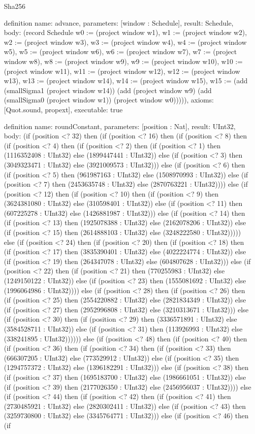 \begin{lexlean}{Sha256}
\begin{semanticmodule}
definition{
  name: advance,
  parameters: [window : Schedule],
  result: Schedule,
  body: (record Schedule {w0 := (project window w1), w1 := (project window w2), w2 := (project window w3), w3 := (project window w4), w4 := (project window w5), w5 := (project window w6), w6 := (project window w7), w7 := (project window w8), w8 := (project window w9), w9 := (project window w10), w10 := (project window w11), w11 := (project window w12), w12 := (project window w13), w13 := (project window w14), w14 := (project window w15), w15 := (add (smallSigma1 (project window w14)) (add (project window w9) (add (smallSigma0 (project window w1)) (project window w0))))}),
  axioms: [Quot.sound, propext],
  executable: true
}

definition{
  name: roundConstant,
  parameters: [position : Nat],
  result: UInt32,
  body: (if (position <? 32) then (if (position <? 16) then (if (position <? 8) then (if (position <? 4) then (if (position <? 2) then (if (position <? 1) then (1116352408 : UInt32) else (1899447441 : UInt32)) else (if (position <? 3) then (3049323471 : UInt32) else (3921009573 : UInt32))) else (if (position <? 6) then (if (position <? 5) then (961987163 : UInt32) else (1508970993 : UInt32)) else (if (position <? 7) then (2453635748 : UInt32) else (2870763221 : UInt32)))) else (if (position <? 12) then (if (position <? 10) then (if (position <? 9) then (3624381080 : UInt32) else (310598401 : UInt32)) else (if (position <? 11) then (607225278 : UInt32) else (1426881987 : UInt32))) else (if (position <? 14) then (if (position <? 13) then (1925078388 : UInt32) else (2162078206 : UInt32)) else (if (position <? 15) then (2614888103 : UInt32) else (3248222580 : UInt32))))) else (if (position <? 24) then (if (position <? 20) then (if (position <? 18) then (if (position <? 17) then (3835390401 : UInt32) else (4022224774 : UInt32)) else (if (position <? 19) then (264347078 : UInt32) else (604807628 : UInt32))) else (if (position <? 22) then (if (position <? 21) then (770255983 : UInt32) else (1249150122 : UInt32)) else (if (position <? 23) then (1555081692 : UInt32) else (1996064986 : UInt32)))) else (if (position <? 28) then (if (position <? 26) then (if (position <? 25) then (2554220882 : UInt32) else (2821834349 : UInt32)) else (if (position <? 27) then (2952996808 : UInt32) else (3210313671 : UInt32))) else (if (position <? 30) then (if (position <? 29) then (3336571891 : UInt32) else (3584528711 : UInt32)) else (if (position <? 31) then (113926993 : UInt32) else (338241895 : UInt32)))))) else (if (position <? 48) then (if (position <? 40) then (if (position <? 36) then (if (position <? 34) then (if (position <? 33) then (666307205 : UInt32) else (773529912 : UInt32)) else (if (position <? 35) then (1294757372 : UInt32) else (1396182291 : UInt32))) else (if (position <? 38) then (if (position <? 37) then (1695183700 : UInt32) else (1986661051 : UInt32)) else (if (position <? 39) then (2177026350 : UInt32) else (2456956037 : UInt32)))) else (if (position <? 44) then (if (position <? 42) then (if (position <? 41) then (2730485921 : UInt32) else (2820302411 : UInt32)) else (if (position <? 43) then (3259730800 : UInt32) else (3345764771 : UInt32))) else (if (position <? 46) then (if }
\end{semanticmodule}
\end{lexlean}
